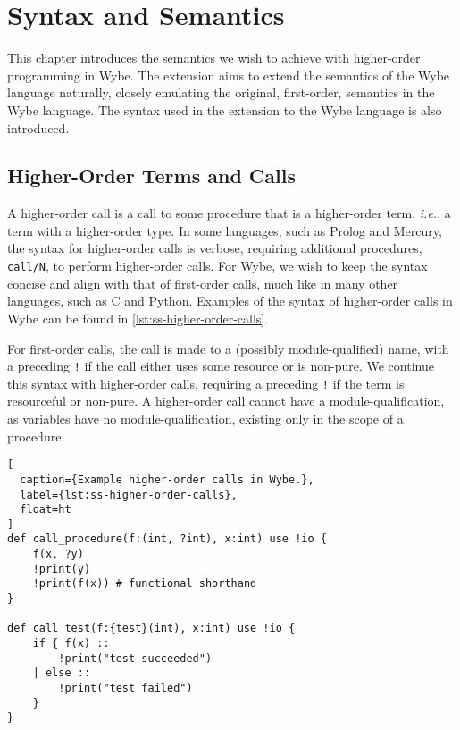 \clearpage

\def\chaptertitle{Syntax and Semantics}

\lhead{\emph{\chaptertitle}}

\chapter{\chaptertitle}
\label{ch:semantics}

This chapter introduces the semantics we wish to achieve with higher-order programming in Wybe. The extension aims to extend the semantics of the Wybe language naturally, closely emulating the original, first-order, semantics in the Wybe language. The syntax used in the extension to the Wybe language is also introduced.

\section{Higher-Order Terms and Calls}
\label{sec:ss-higher-order-terms}

A higher-order call is a call to some procedure that is a higher-order term, \textit{i.e.}, a term with a higher-order type. In some languages, such as Prolog and Mercury, the syntax for higher-order calls is verbose, requiring additional procedures, \texttt{call/N}, to perform higher-order calls. For Wybe, we wish to keep the syntax concise and align with that of first-order calls, much like in many other languages, such as C and Python. Examples of the syntax of higher-order calls in Wybe can be found in \cref{lst:ss-higher-order-calls}. 

For first-order calls, the call is made to a (possibly module-qualified) name, with a preceding \texttt{!} if the call either uses some resource or is non-pure. We continue this syntax with higher-order calls, requiring a preceding \texttt{!} if the term is resourceful or non-pure. A higher-order call cannot have a module-qualification, as variables have no module-qualification, existing only in the scope of a procedure.

\begin{lstlisting}[
  caption={Example higher-order calls in Wybe.},
  label={lst:ss-higher-order-calls},
  float=ht
]
def call_procedure(f:(int, ?int), x:int) use !io {
    f(x, ?y)
    !print(y)
    !print(f(x)) # functional shorthand
}

def call_test(f:{test}(int), x:int) use !io {
    if { f(x) :: 
        !print("test succeeded")
    | else :: 
        !print("test failed")
    }
}
\end{lstlisting}

